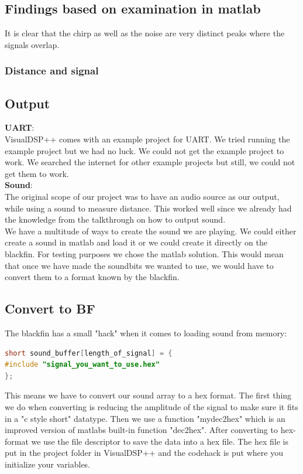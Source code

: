 \subsection{Findings based on examination in matlab}
It is clear that the chirp as well as the noise are very distinct peaks where the signals overlap. 

\subsubsection{Distance and signal}
\subsection{Output}
\textbf{UART}:\\
VisualDSP++ comes with an example project for UART. We tried running the example project but we had no luck. We could not get the example project to work. We searched the internet for other example projects but still, we could not get them to work. \\
\textbf{Sound}:\\
The original scope of our project was to have an audio source as our output, while using a sound to measure distance. This worked well since we already had the knowledge from the talkthrough on how to output sound.\\
We have a multitude of ways to create the sound we are playing. We could either create a sound in matlab and load it or we could create it directly on the blackfin. For testing purposes we chose the matlab solution. This would mean that once we have made the soundbits we wanted to use, we would have to convert them to a format known by the blackfin.
\subsection{Convert to BF}
The blackfin has a small "hack" when it comes to loading sound from memory:
\begin{lstlisting}[language=C]
short sound_buffer[length_of_signal] = { 
#include "signal_you_want_to_use.hex"
};
\end{lstlisting}
This means we have to convert our sound array to a hex format. The first thing we do when converting is reducing the amplitude of the signal to make sure it fits in a "c style short" datatype. Then we use a function "mydec2hex" which is an improved version of matlabs built-in function "dec2hex". After converting to hex-format we use the file descriptor to save the data into a hex file. The hex file is put in the project folder in VisualDSP++ and the codehack is put where you initialize your variables.
